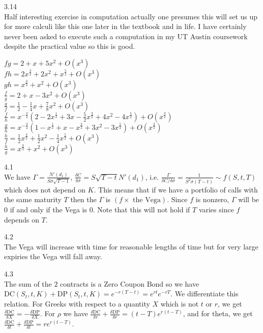 3.14 \\
Half interesting exercise in computation actually one presumes this will set us up for more calculi like this one later in the textbook and in life. I have certainly never been asked to execute such a computation in my UT Austin coursework despite the practical value so this is good.

$fg = 2+x+5x^2+O(x^3)$ \\
$fh = 2x^{\frac{3}{2}}+2x^2+x^{\frac{5}{2}}+O(x^3)$ \\
$gh = x^{\frac{3}{2}}+x^2+O(x^3)$ \\
$\frac{f}{g} = 2+x-3x^2+O(x^3)$ \\
$\frac{g}{f} = \frac{1}{2}-\frac{1}{4}x+\frac{7}{8}x^2+O(x^3)$ \\
$\frac{f}{h} = x^{-\frac{3}{2}}\left( 2-2x^{\frac{1}{2}}+3x-\frac{5}{2}x^{\frac{3}{2}}+4x^2-4x^{\frac{5}{2}} \right)+O(x^{\frac{3}{2}})$ \\
$\frac{g}{h} = x^{-\frac{3}{2}}\left( 1-x^{\frac{1}{2}}+x-x^{\frac{3}{2}}+3x^2-3x^{\frac{5}{2}} \right)+O(x^{\frac{3}{2}})$ \\
$\frac{h}{f} = \frac{1}{2}x^{\frac{3}{2}}+\frac{1}{2}x^2-\frac{1}{4}x^{\frac{5}{2}}+O(x^3)$ \\
$\frac{h}{g} = x^{\frac{3}{2}}+x^2+O(x^3)$

4.1 \\
We have $\Gamma = \frac{N'(d_1)}{S \sigma \sqrt{T-1}}$, $\frac{\delta C}{\delta \sigma} = S \sqrt{T-t} N'(d_1)$, i.e. $\frac{\Gamma}{\delta C/ \delta \sigma}=\frac{1}{S^2 \sigma (T-t)} \sim f(S,t,T)$ which does not depend on $K$. This means that if we have a portfolio of calls with the same maturity $T$ then the $\Gamma$ is $(f \times \text{ the Vega})$. Since $f$ is nonzero, $\Gamma$ will be $0$ if and only if the Vega is $0$. Note that this will not hold if $T$ varies since $f$ depends on $T$.

4.2 \\
The Vega will increase with time for reasonable lengths of time but for very large expiries the Vega will fall away.

4.3 \\
The sum of the $2$ contracts is a Zero Coupon Bond so we have $\text{DC}(S_t,t,K)+\text{DP}(S_t,t,K) = e^{-r(T-t)} = e^{rt} e^{-rT}$. We differentiate this relation. For Greeks with respect to a quantity $X$ which is not $t$ or $r$, we get $\frac{\delta \text{DC}}{\delta X}=-\frac{\delta \text{DP}}{\delta X}$. For $\rho$ we have $\frac{\delta \text{DC}}{\delta r}+\frac{\delta \text{DP}}{\delta r}=(t-T)e^{r(t-T)}$, and for theta, we get $\frac{\delta \text{DC}}{\delta t}+\frac{\delta \text{DP}}{\delta t}=re^{r(t-T)}$.

